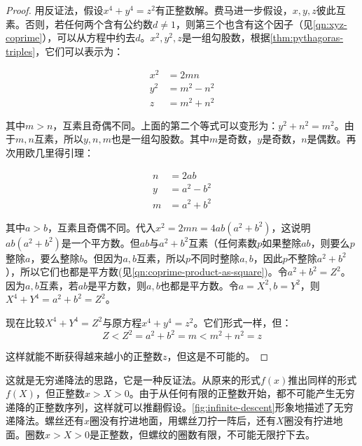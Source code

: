 \documentclass[b5paper]{ctexart}
\begin{document}
\begin{proof}
用反证法，假设$x^4 + y^4 = z^2$有正整数解。费马进一步假设，$x, y, z$彼此互素。否则，若任何两个含有公约数$d \ne 1$，则第三个也含有这个因子（见\cref{qn:xyz-coprime}），可以从方程中约去$d$。$x^2, y^2, z$是一组勾股数，根据\cref{thm:pythagoras-triples}，它们可以表示为：

\begin{align*}
x^2 &= 2mn \\
y^2 &= m^2 - n^2 \\
z &= m^2 + n^2
\end{align*}

其中$m > n$，互素且奇偶不同。上面的第二个等式可以变形为：$y^2 + n^2 = m^2$。由于$m, n$互素，所以$y, n, m$也是一组勾股数。其中$m$是奇数，$y$是奇数，$n$是偶数。再次用欧几里得引理：

\begin{align*}
n &= 2ab \\
y &= a^2 - b^2 \\
m &= a^2 + b^2
\end{align*}

其中$a > b$，互素且奇偶不同。代入$x^2 = 2mn = 4ab(a^2 + b^2)$，这说明$ab(a^2 + b^2)$是一个平方数。但$ab$与$a^2 + b^2$互素（任何素数$p$如果整除$ab$，则要么$p$整除$a$，要么整除$b$。但因为$a, b$互素，所以$p$不同时整除$a, b$，因此$p$不整除$a^2 + b^2$），所以它们也都是平方数(见\cref{qn:coprime-product-as-square})。令$a^2 + b^2 = Z^2$。因为$a, b$互素，若$ab$是平方数，则$a, b$也都是平方数。令$a = X^2, b= Y^2$，则$X^4 + Y^4 = a^2 + b^2 = Z^2$。

现在比较$X^4 + Y^4 = Z^2$与原方程$x^4 + y^4 = z^2$。它们形式一样，但：
\[
Z < Z^2 = a^2 + b^2 = m < m^2 + n^2 = z
\]

这样就能不断获得越来越小的正整数$z$，但这是不可能的。
\end{proof}

这就是无穷递降法的思路，它是一种反证法。从原来的形式$f(x)$推出同样的形式$f(X)$，但正整数$x > X > 0$。由于从任何有限的正整数开始，都不可能产生无穷递降的正整数序列，这样就可以推翻假设。\cref{fig:infinite-descent}形象地描述了无穷递降法。螺丝还有$x$圈没有拧进地面，用螺丝刀拧一阵后，还有$X$圈没有拧进地面。圈数$x > X > 0$是正整数，但螺纹的圈数有限，不可能无限拧下去。
\end{document}

